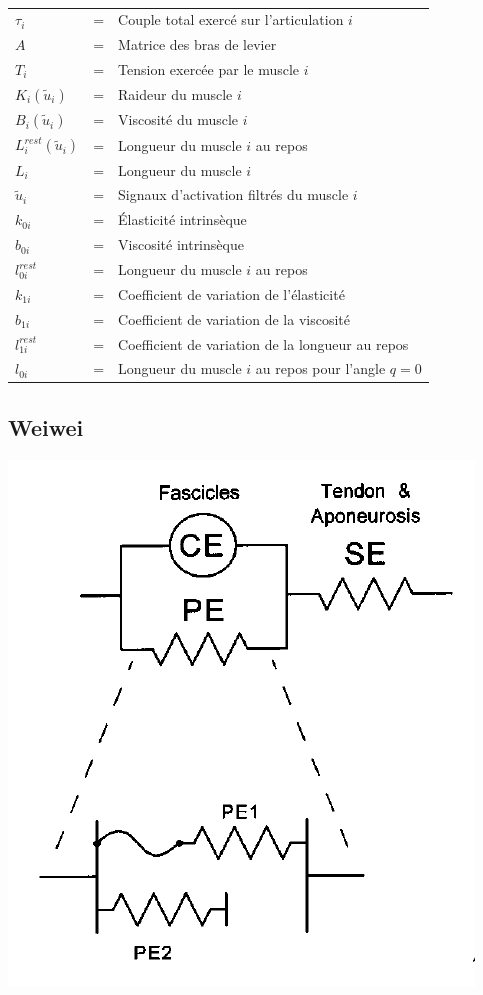 \documentclass[pdftex,a4paper,11pt]{article}
\numberwithin{equation}{subsection}
\begin{document}
\paragraph{}
\begin{tabular}{lcl}
    $\tau_i$ & = & Couple total exercé sur l'articulation $i$ \\
    $A$  & = & Matrice des bras de levier \\
    $T_i$  & = & Tension exercée par le muscle $i$ \\
    $K_i(\tilde{u}_i)$ & = & Raideur du muscle $i$ \\
    $B_i(\tilde{u}_i)$ & = & Viscosité du muscle $i$ \\
    $L_i^{rest}(\tilde{u}_i)$ & = & Longueur du muscle $i$ au repos \\
    $L_i$ & = & Longueur du muscle $i$ \\
    $\tilde{u}_i$ & = & Signaux d'activation filtrés du muscle $i$ \\
    $k_{0i}$ & = & Élasticité intrinsèque \\
    $b_{0i}$ & = & Viscosité intrinsèque \\
    $l^{rest}_{0i}$ & = & Longueur du muscle $i$ au repos \\
    $k_{1i}$ & = & Coefficient de variation de l'élasticité \\
    $b_{1i}$ & = & Coefficient de variation de la viscosité \\
    $l^{rest}_{1i}$ & = & Coefficient de variation de la longueur au repos \\
    $l_{0i}$ & = & Longueur du muscle $i$ au repos pour l'angle $q = 0$ \\
\end{tabular}


\subsection{Weiwei}

\begin{center}
        \includegraphics[width=.40\linewidth]{fig/brown}
\end{center}
\end{document}
